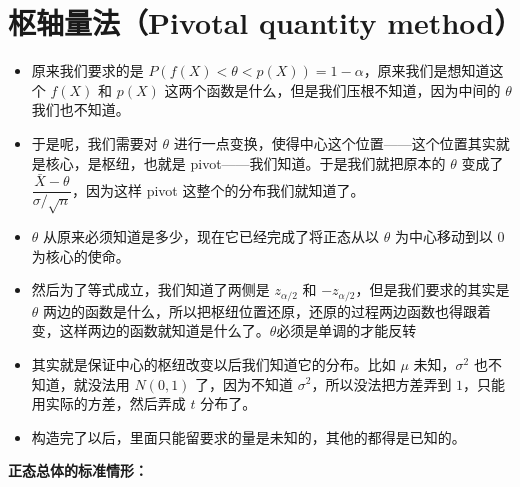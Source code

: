 \section{枢轴量法（Pivotal quantity method）}

    \begin{itemize}

\item 原来我们要求的是 $P(f(X) < \theta < p(X)) = 1-\alpha$，原来我们是想知道这个 $f(X)$ 和 $p(X)$ 这两个函数是什么，但是我们压根不知道，因为中间的 $\theta$ 我们也不知道。

\item 于是呢，我们需要对 $\theta$ 进行一点变换，使得中心这个位置——这个位置其实就是核心，是枢纽，也就是 pivot——我们知道。于是我们就把原本的 $\theta$ 变成了 $\dfrac{\bar{X} - \theta}{\sigma / \sqrt{n}}$，因为这样 pivot 这整个的分布我们就知道了。

\item $\theta$ 从原来必须知道是多少，现在它已经完成了将正态从以 $\theta$ 为中心移动到以 $0$ 为核心的使命。

\item 然后为了等式成立，我们知道了两侧是 $z_{\alpha/2}$ 和 $-z_{\alpha/2}$，但是我们要求的其实是 $\theta$ 两边的函数是什么，所以把枢纽位置还原，还原的过程两边函数也得跟着变，这样两边的函数就知道是什么了。$\theta$必须是单调的才能反转

\end{itemize}
\begin{dxtips}
  \begin{itemize}
    \item 其实就是保证中心的枢纽改变以后我们知道它的分布。比如 $\mu$ 未知，$\sigma^2$ 也不知道，就没法用 $N(0,1)$ 了，因为不知道 $\sigma^2$，所以没法把方差弄到 $1$，只能用实际的方差，然后弄成 $t$ 分布了。
    \item 构造完了以后，里面只能留要求的量是未知的，其他的都得是已知的。
\end{itemize}
\end{dxtips}
\textbf{正态总体的标准情形：}
